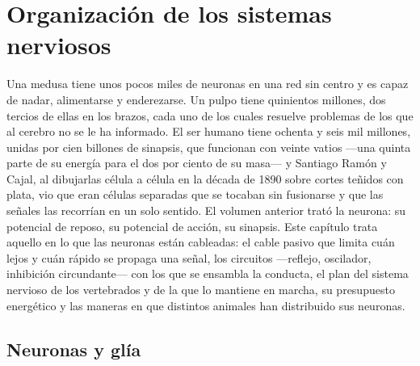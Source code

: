 \chapter{Organización de los sistemas nerviosos}\label{ch:b3:nervous-systems}

Una medusa tiene unos pocos miles de neuronas en una red sin centro y
es capaz de nadar, alimentarse y enderezarse. Un pulpo tiene quinientos
millones, dos tercios de ellas en los brazos, cada uno de los cuales
resuelve problemas de los que al cerebro no se le ha informado. El ser
humano tiene ochenta y seis mil millones, unidas por cien billones de
sinapsis, que funcionan con veinte vatios ---una quinta parte de su
energía para el dos por ciento de su masa--- y Santiago Ramón y Cajal,
al dibujarlas célula a célula en la década de 1890 sobre cortes teñidos
con plata, vio que eran células separadas que se tocaban sin fusionarse
y que las señales las recorrían en un solo sentido. El volumen anterior
trató la neurona: su potencial de reposo, su potencial de acción, su
sinapsis. Este capítulo trata aquello en lo que las neuronas están
cableadas: el cable pasivo que limita cuán lejos y cuán rápido se
propaga una señal, los circuitos ---reflejo, oscilador, inhibición
circundante--- con los que se ensambla la conducta, el plan del sistema
nervioso de los vertebrados y de la  que lo mantiene en marcha, su
presupuesto energético y las maneras en que distintos animales han
distribuido sus neuronas.

\section{Neuronas y glía}

